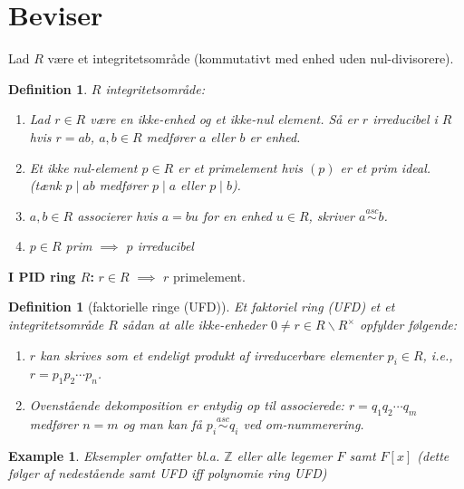 \documentclass[10pt,twoside,openany,final]{memoir}
\theoremstyle{break}
\newtheorem{definition}[section]{Definition}
\theoremstyle{Break}
\newtheorem{example}[section]{Example}
\newcommand{\Z}{\mathbb{Z}}
\begin{document}
\section*{Beviser}
Lad $R$ være et integritetsområde (kommutativt med enhed uden nul-divisorere).
\begin{definition}
$R$ integritetsområde:
\begin{enumerate}
\item Lad $r \in R$ være en ikke-enhed og et ikke-nul element. Så er $r$ \emph{irreducibel} i $R$ hvis $r=ab$, $a,b \in R$ medfører $a$ eller $b$ er enhed.
\item Et ikke nul-element $p \in R$ er et \emph{primelement} hvis $(p)$ er et prim ideal. (tænk $p\mid ab$ medfører $p \mid a$ eller $p \mid b$).
\item $a,b \in R$ \emph{associerer} hvis $a=bu$ for en enhed $u \in R$, skriver $a \stackrel{asc}{\sim} b$.
\item $p \in R$ prim $\implies$ $p$ irreducibel
\end{enumerate}
\end{definition}
\textbf{I PID ring $R$:} $r \in R$ $\implies$ $r$ primelement.
\begin{definition}[faktorielle ringe (UFD)]
Et faktoriel ring (UFD) et et integritetsområde $R$ sådan at alle ikke-enheder $0 \neq r \in R\backslash R^{\times}$ opfylder følgende:
\begin{enumerate}
\item $r$ kan skrives som et endeligt produkt af irreducerbare elementer $p_i \in R$, i.e., $r=p_1p_2\cdots p_n$.
\item Ovenstående dekomposition er entydig op til associerede: $r=q_1q_2\cdots q_m$ medfører $n=m$ og man kan få $p_i\stackrel{asc}{\sim} q_i$ ved om-nummerering.
\end{enumerate}  
\end{definition}
\begin{example}
Eksempler omfatter bl.a. $\Z$ eller alle legemer $F$ samt $F[x]$ (dette følger af nedestående samt UFD iff polynomie ring UFD)
\end{example}
\end{document}
